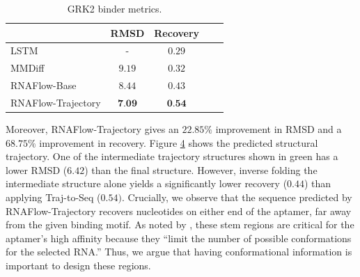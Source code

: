\begin{table}[h]
    \centering
    \small
    \caption{GRK2 binder metrics.}
    \vspace{0.05in}
    \renewcommand\thetable{3}
    \begin{tabular} {lcc@{\hskip 0.25in}cc}
        \hline
        & RMSD & Recovery \\ \hline
        LSTM & - & $0.29$ \\
        MMDiff & $9.19$ & $0.32$ \\ \hline
        RNAFlow-Base & $8.44$ & $0.43$ \\
        RNAFlow-Trajectory & $\textbf{7.09}$ & $\textbf{0.54}$ \\ \hline
    \end{tabular}
    \label{tab:3}
\end{table}

Moreover, RNAFlow-Trajectory gives an $22.85\%$ improvement in RMSD and a $68.75\%$ improvement in recovery. Figure \hyperref[fig:4]{4} shows the predicted structural trajectory. One of the intermediate trajectory structures shown in green has a lower RMSD ($6.42$) than the final structure. However, inverse folding the intermediate structure alone yields a significantly lower recovery ($0.44$) than applying Traj-to-Seq ($0.54)$. Crucially, we observe that the sequence predicted by RNAFlow-Trajectory recovers nucleotides on either end of the aptamer, far away from the given binding motif. As noted by \citet{tesmer2012molecular}, these stem regions are critical for the aptamer's high affinity because they ``limit the number of possible conformations for the selected RNA.'' Thus, we argue that having conformational information is important to design these regions.

